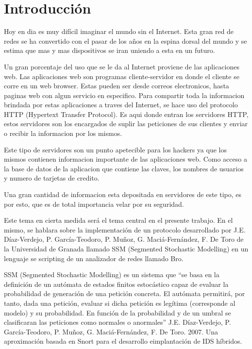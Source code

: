 \chapter*{Introducción}
\label{intro}


Hoy en dia es muy dif\'icil imaginar el mundo sin el Internet. Esta gran red de redes se ha convertido con el pasar de los años en la espina dorsal del mundo y se estima que mas y mas dispositivos se iran uniendo a esta  en un futuro.

Un gran porcentaje del uso que se le da al Internet proviene de las aplicaciones web. Las aplicaciones web son programas cliente-servidor en donde el cliente se corre en un web browser. Estas pueden ser desde correos electronicos, hasta paginas web con algun servicio en especifico. Para compartir toda la informacion brindada por estas aplicaciones a traves del Internet, se hace uso del protocolo HTTP (Hypertext Transfer Protocol). 
Es aqui donde entran los servidores HTTP, estos servidores son los encargados de suplir las peticiones de sus clientes y enviar o recibir la informacion por los mismos.

Este tipo de servidores son un punto apetecible para los hackers ya que los mismos contienen informacion importante de las aplicaciones web. Como acceso a la base de datos de la aplicacion que contiene las claves, los nombres de usuarios y numero de tarjetas de credito.

Una gran cantidad de informacion esta depositada en servidores de este tipo, es por esto, que es de total importancia velar por su seguridad.

Este tema en cierta medida ser\'a el tema central en el presente trabajo. En el mismo, se hablara sobre la implementación de un protocolo desarrollado por J.E. Díaz-Verdejo, P. García-Teodoro, P. Muñoz, G. Maciá-Fernández, F. De Toro de la Universidad de Granada llamado SSM (Segmented Stochastic Modelling) en un lenguaje se scripting de un analizador de redes llamado Bro.

SSM (Segmented Stochastic Modelling) es un sistema que “se basa en la definición de un autómata de estados finitos estocástico capaz de evaluar la probabilidad de generación de una petición concreta. El autómata permitirá, por tanto, dada una petición, evaluar si dicha petición es legítima (corresponde al modelo) y su probabilidad. En función de la probabilidad y de un umbral se clasificaran las peticiones como normales o anormales” J.E. Díaz-Verdejo, P. García-Teodoro, P. Muñoz, G. Maciá-Fernández, F. De Toro. 2007. Una aproximación basada en Snort para el desarrollo eimplantación de IDS híbridos.

